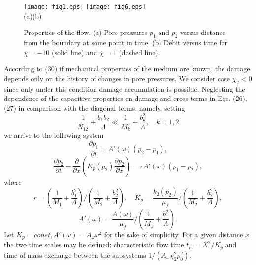 \documentclass[article,authoryear,jpm]{beg_39}             %
\begin{document}
\begin{figure}[!b]
	\centering
\texttt{[image: fig1.eps]} %
\texttt{[image: fig6.eps]} \\
  (a)\hspace*{220pt}(b)
\caption{ Properties of the flow. (a) Pore pressures $p_1$ and $p_2$ versus distance from the boundary at some point in time. (b) Debit versus time for $\chi=-10$ (solid line) and $\chi=1$ (dashed line).}
\label{fig2}
\end{figure}

According to (30) if mechanical properties of the medium are known, the damage depends only on the history of changes in pore pressures.
We consider case ${{\chi}_{2}}< 0$ since only under this condition damage accumulation is possible.
Neglecting the dependence of the capacitive properties on damage and cross terms in Eqs. (26), (27) in comparison with the diagonal terms, namely, setting
\begin{equation}
\frac{1}{{{N}_{12}}}+\frac{{{b}_{1}}{{b}_{2}}}{\Lambda}\ll \frac{1}{{{M}_{k}}}+\frac{b_{k}^{2}}{\Lambda},\quad k=1,2
\end{equation}
we arrive to the following system
\begin{equation}
\frac{\partial {{p}_{1}}}{\partial t}=A'(\omega )({{p}_{2}}-{{p}_{1}}),
\end{equation}
\begin{equation}
\frac{\partial {{p}_{2}}}{\partial t}-\frac{\partial }{\partial x}\left( {{K}_{p}}({{p}_{2}})\frac{\partial {{p}_{2}}}{\partial x} \right)=rA'(\omega )({{p}_{1}}-{{p}_{2}}),
\end{equation}
where
\begin{equation}
r=\left( \frac{1}{{{M}_{1}}}+\frac{b_{1}^{2}}{\Lambda} \right)/\left( \frac{1}{{{M}_{2}}}+\frac{b_{2}^{2}}{\Lambda} \right),\quad {{K}_{p}}=\frac{{{k}_{2}}({{p}_{2}})}{{{\mu }_{f}}}/\left( \frac{1}{{{M}_{2}}}+\frac{b_{2}^{2}}{\Lambda} \right),
\end{equation}
\begin{equation}
A'(\omega )=\frac{A(\omega )}{\mu_f}/ \left( \frac{1}{{{M}_{1}}}+\frac{b_{1}^{2}}{\Lambda}\right).
\end{equation}
Let ${{K}_{p}}=const, A'(\omega )={{A}_{\omega }}{{\omega }^{2}}$ for the sake of simplicity.
For a given distance $x$ the two time scales may be defined: characteristic flow time ${{t}_{m}}={{X}^{2}}/{{K}_{p}}$ and time of mass exchange between the subsystems $1/({{A}_{\omega }}\chi_{2}^{2}p_{0}^{2})$.
\end{document}

